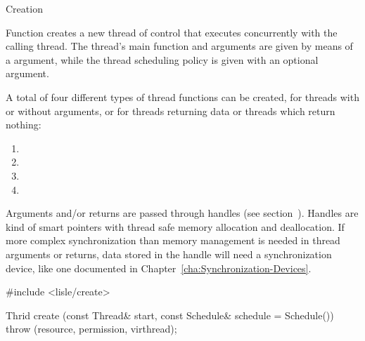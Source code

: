 

\begin{manpage}{Creation}
\let\savedmanlayout=\manlayout
\renewcommand{\manlayout}{vcompact}

Function  creates a new thread of control that executes concurrently with the calling thread.
The thread's main function and arguments are given by means of a  argument, while the thread scheduling policy is given with an optional  argument.

A total of four different types of thread functions can be created,
for threads with or without arguments, or for threads returning data
or threads which return nothing:
\begin{enumerate}
  \item {}
  \item {}
  \item {}
  \item {}
\end{enumerate}
Arguments and/or returns are passed through handles (see section~).
Handles are kind of smart pointers with
thread safe memory allocation and deallocation. If more complex
synchronization than memory management is needed in thread arguments
or returns, data stored in the handle will need a synchronization
device, like one documented in
Chapter~\ref{cha:Synchronization-Devices}.

\begin{mansynopsis}
#include <lisle/create>

Thrid create (const Thread& start,
              const Schedule& schedule = Schedule())
  throw (resource, permission, virthread);
\end{mansynopsis}


\end{manpage}
